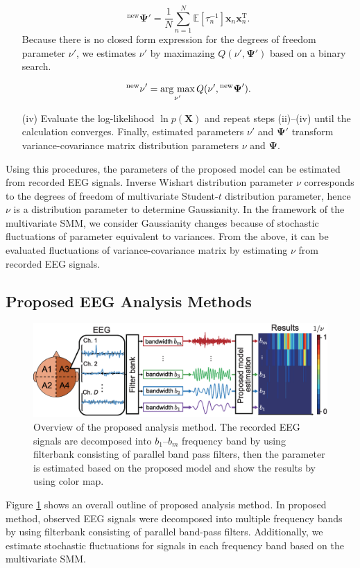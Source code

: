 \documentclass[journal]{IEEEtran}
\newcommand{\argmax}{\mathop{\rm arg\ max}\limits}
\begin{document}
\begin{enumerate}
\begin{equation}%
{^\mathrm{new} \mathbf{\Psi}}' = \frac{1}{N} \sum_{n=1}^{N} \mathbb{E}\left[\tau^{-1}_n\right] \mathbf{x}_n \mathbf{x}_n^\mathrm{T}.
\end{equation}
Because there is no closed form expression for the degrees of freedom parameter $\nu'$, we estimates $\nu'$ by maximazing $Q(\nu',\mathbf{\Psi}')$ based on a binary search.

\begin{equation}%
{^\mathrm{new} \nu}' = \argmax_{\nu'}  Q(\nu', {^\mathrm{new} \mathbf{\Psi}}').
\end{equation}
\item[(iv)] Evaluate the log-likelihood $\ln{p(\mathbf{X})}$ and repeat steps (ii)--(iv) until the calculation converges. Finally, estimated parameters $\nu'$ and $\mathbf{\Psi}'$ transform variance-covariance matrix distribution parameters $\nu$ and $\mathbf{\Psi}$.
\end{enumerate}
Using this procedures, the parameters of the proposed model can be estimated from recorded EEG signals.
Inverse Wishart distribution parameter $\nu$ corresponds to the degrees of freedom of multivariate Student-$t$ distribution parameter, hence $\nu$ is a distribution parameter to determine Gaussianity.
In the framework of the multivariate SMM, we consider Gaussianity changes because of stochastic fluctuations of parameter equivalent to variances.
From the above, it can be evaluated fluctuations of variance-covariance matrix by estimating $\nu$ from recorded EEG signals.

\subsection{Proposed EEG Analysis Methods}
\begin{figure}[!ht]
\centering
\includegraphics[width=0.85\hsize]{figure/system_3.eps}
\caption{Overview of the proposed analysis method. The recorded EEG signals are decomposed into $b_1$--$b_m$ frequency band by using filterbank consisting of parallel band pass filters, then the parameter is estimated based on the proposed model and show the results by using color map.}
\label{fig:system}
\end{figure}
Figure \ref{fig:system} shows an overall outline of proposed analysis method. In proposed method, observed EEG signals were decomposed into multiple frequency bands by using filterbank consisting of parallel band-pass filters. Additionally, we estimate stochastic fluctuations for signals in each frequency band based on the multivariate SMM.
\end{document}
